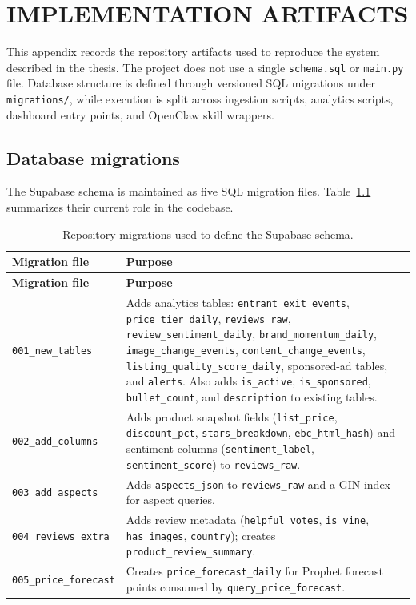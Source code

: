 \chapter{IMPLEMENTATION ARTIFACTS}
\label{app:implementation}

This appendix records the repository artifacts used to reproduce the system described in the thesis. The project does not use a single \texttt{schema.sql} or \texttt{main.py} file. Database structure is defined through versioned SQL migrations under \texttt{migrations/}, while execution is split across ingestion scripts, analytics scripts, dashboard entry points, and OpenClaw skill wrappers.

\section{Database migrations}

The Supabase schema is maintained as five SQL migration files. Table~\ref{tab:appendix_migrations} summarizes their current role in the codebase.

\begin{longtable}{p{}@{\hspace{10pt}}p{}}
  \caption{Repository migrations used to define the Supabase schema.}
  \label{tab:appendix_migrations}\\
  \toprule
  \textbf{Migration file} & \textbf{Purpose} \\
  \midrule
  \endfirsthead
  \toprule
  \textbf{Migration file} & \textbf{Purpose} \\
  \midrule
  \endhead
  {\small\texttt{001\_new\_tables}} & Adds analytics tables: \texttt{entrant\_exit\_events}, \texttt{price\_tier\_daily}, \texttt{reviews\_raw}, \texttt{review\_sentiment\_daily}, \texttt{brand\_momentum\_daily}, \texttt{image\_change\_events}, \texttt{content\_change\_events}, \texttt{listing\_quality\_score\_daily}, sponsored-ad tables, and \texttt{alerts}. Also adds \texttt{is\_active}, \texttt{is\_sponsored}, \texttt{bullet\_count}, and \texttt{description} to existing tables. \\
  {\small\texttt{002\_add\_columns}} & Adds product snapshot fields (\texttt{list\_price}, \texttt{discount\_pct}, \texttt{stars\_breakdown}, \texttt{ebc\_html\_hash}) and sentiment columns (\texttt{sentiment\_label}, \texttt{sentiment\_score}) to \texttt{reviews\_raw}. \\
  {\small\texttt{003\_add\_aspects}} & Adds \texttt{aspects\_json} to \texttt{reviews\_raw} and a GIN index for aspect queries. \\
  {\small\texttt{004\_reviews\_extra}} & Adds review metadata (\texttt{helpful\_votes}, \texttt{is\_vine}, \texttt{has\_images}, \texttt{country}); creates \texttt{product\_review\_summary}. \\
  {\small\texttt{005\_price\_forecast}} & Creates \texttt{price\_forecast\_daily} for Prophet forecast points consumed by \texttt{query\_price\_forecast}. \\
  \bottomrule
\end{longtable}

